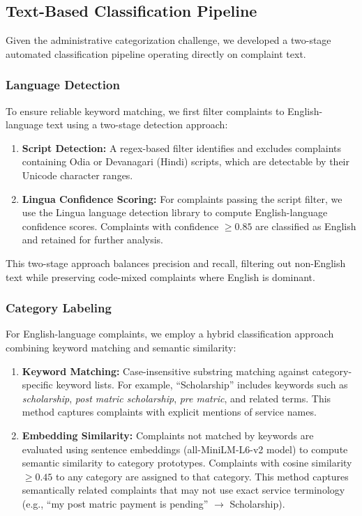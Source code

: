 \documentclass[11pt,a4paper]{article}
\begin{document}
\subsection{Text-Based Classification Pipeline}

Given the administrative categorization challenge, we developed a two-stage automated classification pipeline operating directly on complaint text.

\subsubsection{Language Detection}

To ensure reliable keyword matching, we first filter complaints to English-language text using a two-stage detection approach:

\begin{enumerate}
    \item \textbf{Script Detection:} A regex-based filter identifies and excludes complaints containing Odia or Devanagari (Hindi) scripts, which are detectable by their Unicode character ranges.

    \item \textbf{Lingua Confidence Scoring:} For complaints passing the script filter, we use the Lingua language detection library to compute English-language confidence scores. Complaints with confidence $\geq 0.85$ are classified as English and retained for further analysis.
\end{enumerate}

This two-stage approach balances precision and recall, filtering out non-English text while preserving code-mixed complaints where English is dominant.

\subsubsection{Category Labeling}

For English-language complaints, we employ a hybrid classification approach combining keyword matching and semantic similarity:

\begin{enumerate}
    \item \textbf{Keyword Matching:} Case-insensitive substring matching against category-specific keyword lists. For example, ``Scholarship'' includes keywords such as \textit{scholarship}, \textit{post matric scholarship}, \textit{pre matric}, and related terms. This method captures complaints with explicit mentions of service names.

    \item \textbf{Embedding Similarity:} Complaints not matched by keywords are evaluated using sentence embeddings (all-MiniLM-L6-v2 model) to compute semantic similarity to category prototypes. Complaints with cosine similarity $\geq 0.45$ to any category are assigned to that category. This method captures semantically related complaints that may not use exact service terminology (e.g., ``my post matric payment is pending'' $\rightarrow$ Scholarship).
\end{enumerate}
\end{document}
